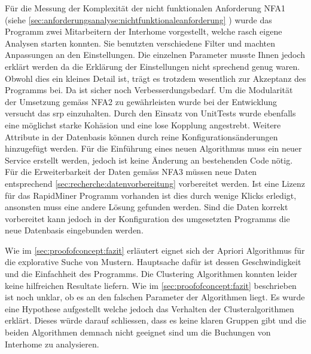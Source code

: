 Für die Messung der Komplexität der nicht funktionalen Anforderung NFA1 (siehe \cref{sec:anforderungsanalyse:nichtfunktionaleanforderung} ) wurde das Programm zwei Mitarbeitern der Interhome vorgestellt, welche rasch eigene Analysen starten konnten. Sie benutzten verschiedene Filter und machten Anpassungen an den Einstellungen. Die einzelnen Parameter musste Ihnen jedoch erklärt werden da die Erklärung der Einstellungen nicht sprechend genug waren. Obwohl dies ein kleines Detail ist, trägt es trotzdem wesentlich zur Akzeptanz des Programms bei. Da ist sicher noch Verbesserdungsbedarf. Um die Modularität der Umsetzung gemäss NFA2 zu gewährleisten wurde bei der Entwicklung versucht das \gls{srp} einzuhalten. Durch den Einsatz von UnitTests wurde ebenfalls eine möglichst starke Kohäsion und eine lose Kopplung angestrebt. Weitere Attribute in der Datenbasis können durch reine Konfigurationsänderungen hinzugefügt werden. Für die Einführung eines neuen Algorithmus muss ein neuer Service erstellt werden, jedoch ist keine Änderung an bestehenden Code nötig. Für die Erweiterbarkeit der Daten gemäss NFA3 müssen neue Daten entsprechend \cref{sec:recherche:datenvorbereitung}  vorbereitet werden. Ist eine Lizenz für das RapidMiner Programm vorhanden ist dies durch wenige Klicks erledigt, ansonsten muss eine andere Lösung gefunden werden. Sind die Daten korrekt vorbereitet kann jedoch in der Konfiguration des umgesetzten Programms die neue Datenbasis eingebunden werden. 

Wie im \cref{sec:proofofconcept:fazit}  erläutert eignet sich der Apriori Algorithmus für die explorative Suche von Mustern. Hauptsache dafür ist dessen Geschwindigkeit und die Einfachheit des Programms. Die Clustering Algorithmen konnten leider keine hilfreichen Resultate liefern. Wie im \cref{sec:proofofconcept:fazit}  beschrieben ist noch unklar, ob es an den falschen Parameter der Algorithmen liegt. Es wurde eine Hypothese aufgestellt welche jedoch das Verhalten der Clusteralgorithmen erklärt. Dieses würde darauf schliessen, dass es keine klaren Gruppen gibt und die beiden Algorithmen demnach nicht geeignet sind um die Buchungen von Interhome zu analysieren.


%
%
%
%

